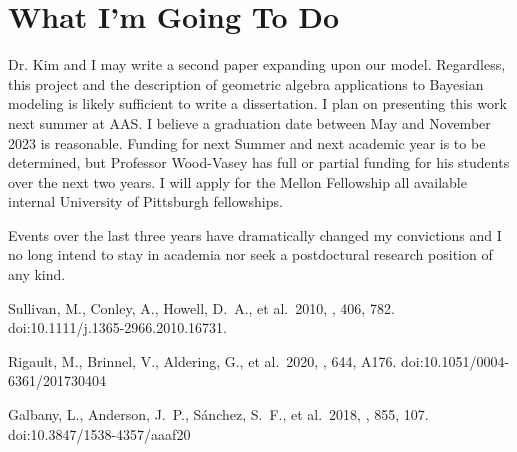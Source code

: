 \documentclass[modern]{aastex62}
\begin{document}
\section{What I'm Going To Do}
Dr. Kim and I may write a second paper expanding upon our model.  Regardless, this project and the description of geometric algebra applications to Bayesian modeling is likely sufficient to write a dissertation.  I plan on presenting this work next summer at AAS.  I believe a  graduation date between May and November 2023 is reasonable.
Funding for next Summer and next academic year is to be determined, but Professor Wood-Vasey has full or partial funding for his students over the next two years.  I will apply for the Mellon Fellowship all available internal University of Pittsburgh fellowships.

Events over the last three years have dramatically changed my convictions and I no long intend to stay in academia nor seek a postdoctural research position of any kind.

\begin{thebibliography}{9}
     Sullivan, M., Conley, A., Howell, D.~A., et al.\ 2010, \mnras, 406, 782. doi:10.1111/j.1365-2966.2010.16731.
    
     Rigault, M., Brinnel, V., Aldering, G., et al.\ 2020, \aap, 644, A176. doi:10.1051/0004-6361/201730404

     Galbany, L., Anderson, J.~P., S{\'a}nchez, S.~F., et al.\ 2018, \apj, 855, 107. doi:10.3847/1538-4357/aaaf20

\end{thebibliography}

\end{document}
